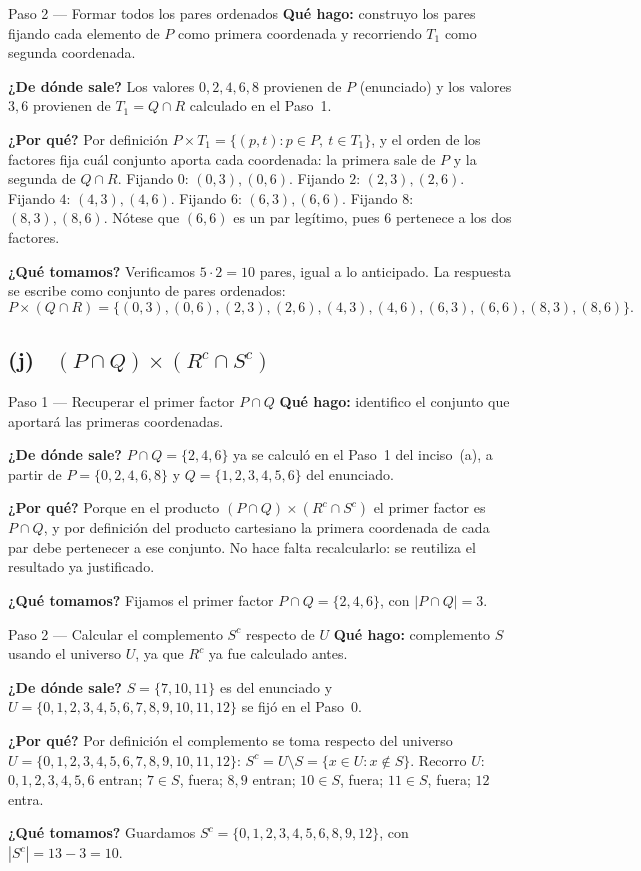 \documentclass[11pt]{article}
\begin{document}
\begin{paso}{Paso 2 --- Formar todos los pares ordenados}
\textbf{Qué hago:} construyo los pares fijando cada elemento de $P$ como primera coordenada y
recorriendo $T_1$ como segunda coordenada.

\textbf{¿De dónde sale?} Los valores $0,2,4,6,8$ provienen de $P$ (enunciado) y los valores
$3,6$ provienen de $T_1=Q\cap R$ calculado en el Paso~1.

\textbf{¿Por qué?} Por definición $P\times T_1=\{(p,t): p\in P,\ t\in T_1\}$, y el orden de los
factores fija cuál conjunto aporta cada coordenada: la primera sale de $P$ y la segunda de
$Q\cap R$. Fijando $0$: $(0,3),(0,6)$. Fijando $2$: $(2,3),(2,6)$. Fijando $4$:
$(4,3),(4,6)$. Fijando $6$: $(6,3),(6,6)$. Fijando $8$: $(8,3),(8,6)$. Nótese que $(6,6)$ es
un par legítimo, pues $6$ pertenece a los dos factores.

\textbf{¿Qué tomamos?} Verificamos $5\cdot 2=10$ pares, igual a lo anticipado. La respuesta se
escribe como conjunto de pares ordenados:
\[
P\times(Q\cap R)=\bigl\{(0,3),(0,6),(2,3),(2,6),(4,3),(4,6),(6,3),(6,6),(8,3),(8,6)\bigr\}.
\]
\end{paso}

\subsection*{(j) \ $(P\cap Q)\times(R^{c}\cap S^{c})$}

\begin{paso}{Paso 1 --- Recuperar el primer factor $P\cap Q$}
\textbf{Qué hago:} identifico el conjunto que aportará las primeras coordenadas.

\textbf{¿De dónde sale?} $P\cap Q=\{2,4,6\}$ ya se calculó en el Paso~1 del inciso~(a), a
partir de $P=\{0,2,4,6,8\}$ y $Q=\{1,2,3,4,5,6\}$ del enunciado.

\textbf{¿Por qué?} Porque en el producto $(P\cap Q)\times(R^{c}\cap S^{c})$ el primer factor
es $P\cap Q$, y por definición del producto cartesiano la primera coordenada de cada par debe
pertenecer a ese conjunto. No hace falta recalcularlo: se reutiliza el resultado ya
justificado.

\textbf{¿Qué tomamos?} Fijamos el primer factor $P\cap Q=\{2,4,6\}$, con $|P\cap Q|=3$.
\end{paso}

\begin{paso}{Paso 2 --- Calcular el complemento $S^{c}$ respecto de $U$}
\textbf{Qué hago:} complemento $S$ usando el universo $U$, ya que $R^{c}$ ya fue calculado
antes.

\textbf{¿De dónde sale?} $S=\{7,10,11\}$ es del enunciado y
$U=\{0,1,2,3,4,5,6,7,8,9,10,11,12\}$ se fijó en el Paso~0.

\textbf{¿Por qué?} Por definición el complemento se toma respecto del universo
$U=\{0,1,2,3,4,5,6,7,8,9,10,11,12\}$: $S^{c}=U\setminus S=\{x\in U: x\notin S\}$. Recorro
$U$: $0,1,2,3,4,5,6$ entran; $7\in S$, fuera; $8,9$ entran; $10\in S$, fuera; $11\in S$,
fuera; $12$ entra.

\textbf{¿Qué tomamos?} Guardamos $S^{c}=\{0,1,2,3,4,5,6,8,9,12\}$, con $|S^{c}|=13-3=10$.
\end{paso}
\end{document}
